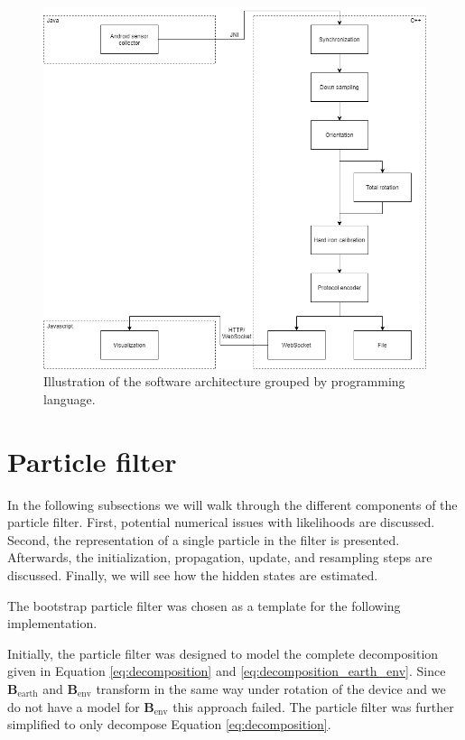 \begin{figure}[hbt!]
    \centering
    \includegraphics[width=1.0\textwidth]{figures/architecture.png}
    \caption{Illustration of the software architecture grouped by programming language.}
    \label{fig:architecture}
\end{figure}

\section{Particle filter}
\label{sec:impl_pf}

In the following subsections we will walk through the different components of the particle filter. First, potential numerical issues with likelihoods are discussed. Second, the representation of a single particle in the filter is presented. Afterwards, the initialization, propagation, update, and resampling steps are discussed. Finally, we will see how the hidden states are estimated.

The bootstrap particle filter\cite{Doucet2011}\cite{Kuensch2013} was chosen as a template for the following implementation.

Initially, the particle filter was designed to model the complete decomposition given in Equation \ref{eq:decomposition} and \ref{eq:decomposition_earth_env}. Since $\bm{B}_\text{earth}$ and $\bm{B}_\text{env}$ transform in the same way under rotation of the device and we do not have a model for $\bm{B}_\text{env}$ this approach failed. The particle filter was further simplified to only decompose Equation \ref{eq:decomposition}.

